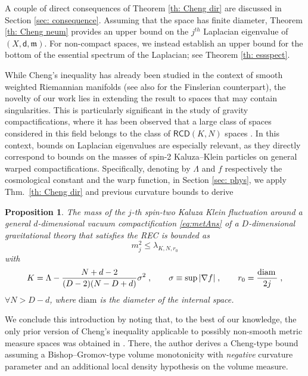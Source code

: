 \documentclass[12pt]{article}
\newcommand{\diam}{{\rm{diam\,}}}
\newcommand{\RCD}{\mathsf{RCD}}
\newcommand{\mm}{\mathfrak m}
\newcommand{\di}{\mathsf{d}}
\theoremstyle{plain}
\newtheorem{proposition}[lemma]{Proposition}
\theoremstyle{definition}
\begin{document}
A couple of direct consequences of Theorem \ref{th: Cheng dir} are discussed in Section \ref{sec: consequence}. Assuming that the space has finite diameter, Theorem \ref{th: Cheng neum} provides an upper bound on the $j^{th}$ Laplacian eigenvalue of $(X,\di,\mm)$. For non-compact spaces, we instead establish an upper bound for the bottom of the essential spectrum of the Laplacian; see Theorem \ref{th: essspect}.

While Cheng's inequality has already been studied in the context of smooth weighted Riemannian manifolds \cite{setti-eigenvalues} (see also \cite{YinHe2015} for the Finslerian counterpart), the novelty of our work lies in extending the result to spaces that may contain singularities. This is particularly significant in the study of gravity compactifications, where it has been observed that a large class of spaces considered in this field belongs to the class of $\RCD(K,N)$ spaces \cite{deluca-deponti-mondino-t}. In this context, bounds on Laplacian eigenvalues are especially relevant, as they directly correspond to bounds on the masses of spin-2 Kaluza–Klein particles on general warped compactifications. Specifically, denoting by $\Lambda$ and $f$ respectively the cosmological constant and the warp function, in Section \ref{sec: phys}, we apply Thm.~\ref{th: Cheng dir} and previous curvature bounds \cite{deluca-t-leaps, deluca-deponti-mondino-t-entropy} to derive
\begin{proposition}\label{prop:kk-intro}
	The mass of the $j$-th spin-two Kaluza Klein fluctuation around a general $d$-dimensional vacuum compactification \eqref{eq:metAns} of a $D$-dimensional gravitational theory that satisfies the REC is bounded as
	\begin{equation}
		m^2_j \leqslant \lambda_{K, N, r_0}
	\end{equation}
	with
	\begin{equation}
		K = \Lambda-\frac{N + d-2}{(D-2)(N-D+d)}\sigma^2\;, \qquad \sigma \equiv \sup{|\nabla f|}\;,\qquad r_0 = \frac{\diam}{2j}\;,
	\end{equation}
	$\forall N > D-d$, where $\mathrm{diam}$ is the diameter of the internal space.
\end{proposition}



We conclude this introduction by noting that, to the best of our knowledge, the only prior version of Cheng’s inequality applicable to possibly non-smooth metric measure spaces was obtained in \cite{kristaly}. There, the author derives a Cheng-type bound assuming a Bishop–Gromov-type volume monotonicity with \emph{negative} curvature parameter and an additional local density hypothesis on the volume measure.
\end{document}

